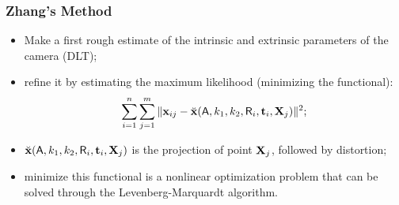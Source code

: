 \documentclass{beamer}
\begin{document}
		\begin{frame}
			\frametitle{Zhang's Method}
			\begin{itemize}
			 \item Make a first rough estimate of the intrinsic and extrinsic parameters of the camera (DLT);
			 \item refine it by estimating the maximum likelihood (minimizing the functional):
			  \begin{equation*}
			    \sum_{i=1}^{n}\sum_{j=1}^{m} \Vert \mathbf{x}_{ij} - \breve{\mathbf{x}}(\mathsf{A}, k_1, k_2, \mathsf{R}_i, \mathbf{t}_i, \mathbf{X}_j) \Vert^2
			    \label{eq:functional};
			  \end{equation*}
				\item $\breve{\mathbf{x}}(\mathsf{A}, k_1, k_2, \mathsf{R}_i, \mathbf{t}_i, \mathbf{X}_j)$ is the projection of point $\mathbf{X}_j$, followed by distortion;
			  \item minimize this functional is a nonlinear optimization problem that can be solved through the Levenberg-Marquardt algorithm.
			\end{itemize}
		\end{frame}


\end{document}
